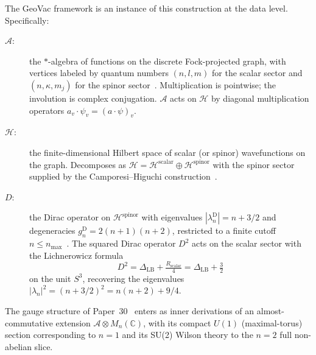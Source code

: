 \documentclass[twocolumn,pra,amsmath,amssymb,superscriptaddress]{revtex4-2}
\begin{document}
The GeoVac framework is an instance of this construction at the data level. Specifically:

\begin{description}
\item[$\mathcal{A}$:]  the $*$-algebra of functions on the discrete
  Fock-projected graph, with vertices labeled by quantum numbers
  $(n, l, m)$ for the scalar sector and $(n, \kappa, m_j)$ for the
  spinor sector~\cite{paper7}.  Multiplication is pointwise; the
  involution is complex conjugation.  $\mathcal{A}$ acts on
  $\mathcal{H}$ by diagonal multiplication operators
  $a_v \cdot \psi_v = (a \cdot \psi)_v$.
\item[$\mathcal{H}$:]  the finite-dimensional Hilbert space of
  scalar (or spinor) wavefunctions on the graph.  Decomposes as
  $\mathcal{H} = \mathcal{H}^{\mathrm{scalar}} \oplus
  \mathcal{H}^{\mathrm{spinor}}$ with the spinor sector supplied by
  the Camporesi--Higuchi construction~\cite{paper28}.
\item[$D$:]  the Dirac operator on $\mathcal{H}^{\mathrm{spinor}}$
  with eigenvalues $|\lambda_n^{\mathrm{D}}| = n + 3/2$ and
  degeneracies $g_n^{\mathrm{D}} = 2(n+1)(n+2)$, restricted to a
  finite cutoff $n \le n_{\max}$~\cite{paper28}.  The squared Dirac
  operator $D^2$ acts on the scalar sector with the
  Lichnerowicz formula~\cite{lichnerowicz1963}
  \[
    D^2 = \Delta_{\mathrm{LB}} + \tfrac{R_{\mathrm{scalar}}}{4}
    = \Delta_{\mathrm{LB}} + \tfrac{3}{2}
  \]
  on the unit $S^3$, recovering the eigenvalues
  $|\lambda_n|^2 = (n + 3/2)^2 = n(n+2) + 9/4$.
\end{description}

The gauge structure of Paper~30~\cite{paper30} enters as inner
derivations of an almost-commutative extension
$\mathcal{A} \otimes M_n(\mathbb{C})$, with its compact $U(1)$
(maximal-torus) section corresponding to $n = 1$ and its SU(2)
Wilson theory to the $n = 2$ full non-abelian slice.
\end{document}
